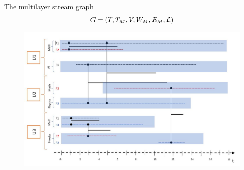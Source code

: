 \documentclass[15pt]{beamer}
\begin{document}
\begin{frame}{The multilayer stream graph}
\[
G=(T,T_M,V,W_M,E_M,\cal{L})
\]

\begin{figure}
    \centering
    \includegraphics[width=\linewidth]{img/chercheurs.jpg}
    \label{fig:chercheurs}
\end{figure}
\end{frame}
\end{document}
